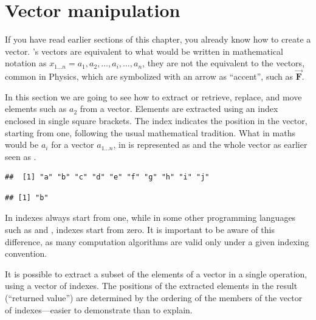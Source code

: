 \documentclass[krantz2]{krantz}\usepackage{knitr}%
\begin{document}
\section{Vector manipulation}\label{sec:vectors}\label{sec:calc:indexing}
If you have read earlier sections of this chapter, you already know how to create a vector. \Rlang's vectors are equivalent to what would be written in mathematical notation as $x_{1\ldots n} = a_1, a_2, \ldots, a_i, \ldots, a_n$, they are not the equivalent to the vectors, common in Physics, which are symbolized with an arrow as ``accent'', such as $\overrightarrow{\mathbf{F}}$.

In this section we are going to see how to extract or retrieve, replace, and move elements such as $a_2$ from a vector. Elements are extracted using an index enclosed in single square brackets. The index indicates the position in the vector, starting from one, following the usual mathematical tradition. What in maths would be $a_i$ for a vector $a_{1\ldots n}$, in \Rpgrm is represented as  and the whole vector as earlier seen as .

\begin{knitrout}\footnotesize
{}\color{fgcolor}\begin{kframe}
\begin{alltt}
 \hlkwb{<-} \hlstd{letters[}\hlopt{:}\hlstd{]}
\end{alltt}
\begin{verbatim}
##  [1] "a" "b" "c" "d" "e" "f" "g" "h" "i" "j"
\end{verbatim}
\begin{alltt}
\hlstd{a[}\hlstd{]}
\end{alltt}
\begin{verbatim}
## [1] "b"
\end{verbatim}
\end{kframe}
\end{knitrout}

\begin{explainbox}
In \Rlang indexes always start from one, while in some other programming languages such as \Clang and \Cpplang, indexes start from zero. It is important to be aware of this difference, as many computation algorithms are valid only under a given indexing convention.
\end{explainbox}

It is possible to extract a subset of the elements of a vector in a single operation, using a vector of indexes. The positions of the extracted elements in the result (``returned value'') are determined by the ordering of the members of the vector of indexes---easier to demonstrate than to explain.
\end{document}
